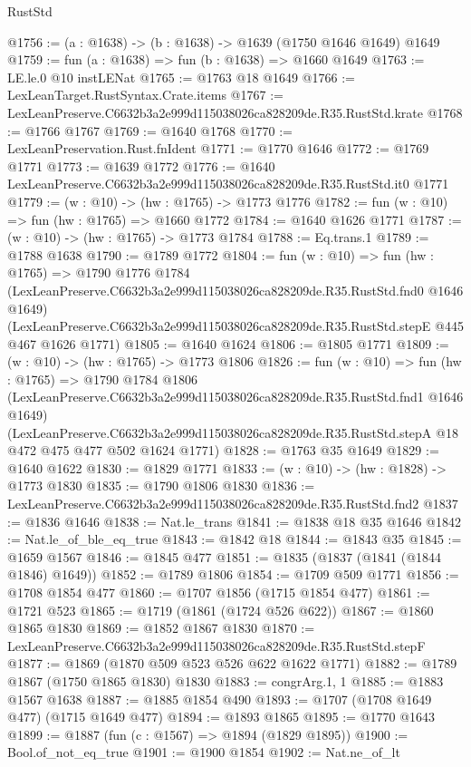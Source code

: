 \begin{lexlean}{RustStd}
\begin{coremodule}
@1756 := (a : @1638) -> (b : @1638) -> @1639 (@1750 @1646 @1649) @1649
@1759 := fun (a : @1638) => fun (b : @1638) => @1660 @1649
@1763 := LE.le.{0} @10 instLENat
@1765 := @1763 @18 @1649
@1766 := LexLeanTarget.RustSyntax.Crate.items
@1767 := LexLeanPreserve.C6632b3a2e999d115038026ca828209de.R35.RustStd.krate
@1768 := @1766 @1767
@1769 := @1640 @1768
@1770 := LexLeanPreservation.Rust.fnIdent
@1771 := @1770 @1646
@1772 := @1769 @1771
@1773 := @1639 @1772
@1776 := @1640 LexLeanPreserve.C6632b3a2e999d115038026ca828209de.R35.RustStd.it0 @1771
@1779 := (w : @10) -> (hw : @1765) -> @1773 @1776
@1782 := fun (w : @10) => fun (hw : @1765) => @1660 @1772
@1784 := @1640 @1626 @1771
@1787 := (w : @10) -> (hw : @1765) -> @1773 @1784
@1788 := Eq.trans.{1}
@1789 := @1788 @1638
@1790 := @1789 @1772
@1804 := fun (w : @10) =>
  fun (hw : @1765) =>
  @1790
    @1776
    @1784
    (LexLeanPreserve.C6632b3a2e999d115038026ca828209de.R35.RustStd.fnd0 @1646 @1649)
    (LexLeanPreserve.C6632b3a2e999d115038026ca828209de.R35.RustStd.stepE @445 @467 @1626 @1771)
@1805 := @1640 @1624
@1806 := @1805 @1771
@1809 := (w : @10) -> (hw : @1765) -> @1773 @1806
@1826 := fun (w : @10) =>
  fun (hw : @1765) =>
  @1790
    @1784
    @1806
    (LexLeanPreserve.C6632b3a2e999d115038026ca828209de.R35.RustStd.fnd1 @1646 @1649)
    (LexLeanPreserve.C6632b3a2e999d115038026ca828209de.R35.RustStd.stepA
      @18
      @472
      @475
      @477
      @502
      @1624
      @1771)
@1828 := @1763 @35 @1649
@1829 := @1640 @1622
@1830 := @1829 @1771
@1833 := (w : @10) -> (hw : @1828) -> @1773 @1830
@1835 := @1790 @1806 @1830
@1836 := LexLeanPreserve.C6632b3a2e999d115038026ca828209de.R35.RustStd.fnd2
@1837 := @1836 @1646
@1838 := Nat.le_trans
@1841 := @1838 @18 @35 @1646
@1842 := Nat.le_of_ble_eq_true
@1843 := @1842 @18
@1844 := @1843 @35
@1845 := @1659 @1567
@1846 := @1845 @477
@1851 := @1835 (@1837 (@1841 (@1844 @1846) @1649))
@1852 := @1789 @1806
@1854 := @1709 @509 @1771
@1856 := @1708 @1854 @477
@1860 := @1707 @1856 (@1715 @1854 @477)
@1861 := @1721 @523
@1865 := @1719 (@1861 (@1724 @526 @622))
@1867 := @1860 @1865 @1830
@1869 := @1852 @1867 @1830
@1870 := LexLeanPreserve.C6632b3a2e999d115038026ca828209de.R35.RustStd.stepF
@1877 := @1869 (@1870 @509 @523 @526 @622 @1622 @1771)
@1882 := @1789 @1867 (@1750 @1865 @1830) @1830
@1883 := congrArg.{1, 1}
@1885 := @1883 @1567 @1638
@1887 := @1885 @1854 @490
@1893 := @1707 (@1708 @1649 @477) (@1715 @1649 @477)
@1894 := @1893 @1865
@1895 := @1770 @1643
@1899 := @1887 (fun (c : @1567) => @1894 (@1829 @1895))
@1900 := Bool.of_not_eq_true
@1901 := @1900 @1854
@1902 := Nat.ne_of_lt

\end{coremodule}
\end{lexlean}

